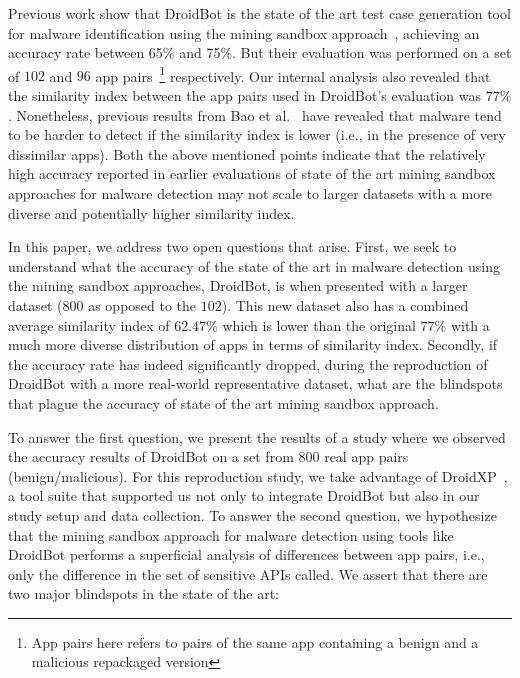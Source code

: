 Previous work show that DroidBot is the state of the art test case generation tool for malware identification using the mining sandbox approach~\cite{DBLP:conf/wcre/BaoLL18,DBLP:journals/jss/CostaMMSSBNR22}, achieving an accuracy rate between 65\% and 75\%. But their evaluation was performed on a set of $102$ and $96$ app pairs~\footnote{App pairs here refers to pairs of the same app containing a benign and a malicious repackaged version} respectively. Our internal analysis also revealed that the similarity index between the app pairs used in DroidBot's evaluation was $77\%$. Nonetheless, previous results from Bao et al.~\cite{DBLP:conf/iceccs/LeB0GL18} %
have revealed that malware tend to be harder to detect if the similarity index is lower (i.e., in the presence of very dissimilar apps). Both the above mentioned points indicate that the relatively high accuracy reported in earlier evaluations of state of the art mining sandbox approaches for malware detection may not scale to larger datasets with a more diverse and potentially higher similarity index.

In this paper, we address two open questions that arise. First, we seek to understand what the accuracy of the state of the art in malware detection using the mining sandbox approaches, DroidBot, is when presented with a larger dataset ($800$ as opposed to the $102$). This new dataset also has a combined average similarity index of $62.47\%$ which is lower than the original $77\%$ with a much more diverse distribution of apps in terms of similarity index. Secondly, if the accuracy rate has indeed significantly dropped, during the reproduction of DroidBot with a more real-world representative dataset, what are the blindspots that plague the accuracy of state of the art mining sandbox approach. 

To answer the first question, we present the results of a study where we observed the accuracy results of DroidBot on a set from $800$ real app pairs (benign/malicious). For this reproduction study, we take advantage of DroidXP~\cite{DBLP:conf/scam/CostaMCMVBC20}, a tool suite that supported us not only to integrate DroidBot but also in our study setup and data collection. To answer the second question, we hypothesize that the mining sandbox approach for malware detection using tools like DroidBot performs a superficial analysis of differences between app pairs, i.e., only the difference in the set of sensitive APIs called. We assert that there are two major blindspots in the state of the art:

